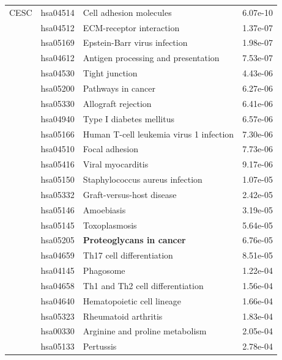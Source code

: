 \begin{longtable}{cllr}
\midrule 
CESC & hsa04514 & \textcolor{\clrnew}{Cell adhesion molecules} & 6.07e-10\\ 
 & hsa04512 & \textcolor{\clrnew}{ECM-receptor interaction} & 1.37e-07 \\ 
 & hsa05169 & \textcolor{\clrnew}{Epstein-Barr virus infection} & 1.98e-07 \\ 
 & hsa04612 & \textcolor{\clrnew}{Antigen processing and presentation} & 7.53e-07 \\ 
 & hsa04530 & \textcolor{\clrnew}{Tight junction} & 4.43e-06 \\ 
 & hsa05200 & \textcolor{\clrnew}{Pathways in cancer} & 6.27e-06 \\ 
 & hsa05330 & \textcolor{\clrnew}{Allograft rejection} & 6.41e-06 \\ 
 & hsa04940 & \textcolor{\clrnew}{Type I diabetes mellitus} & 6.57e-06 \\ 
 & hsa05166 & \textcolor{\clrnew}{Human T-cell leukemia virus 1 infection} & 7.30e-06 \\ 
 & hsa04510 & \textcolor{\clrnew}{Focal adhesion} & 7.73e-06 \\ 
 & hsa05416 & \textcolor{\clrnew}{Viral myocarditis} & 9.17e-06 \\ 
 & hsa05150 & \textcolor{\clrnew}{Staphylococcus aureus infection} & 1.07e-05 \\ 
 & hsa05332 & \textcolor{\clrnew}{Graft-versus-host disease} & 2.42e-05 \\ 
 & hsa05146 & \textcolor{\clrnew}{Amoebiasis} & 3.19e-05 \\ 
 & hsa05145 & \textcolor{\clrnew}{Toxoplasmosis} & 5.64e-05 \\ 
 \rowcolor{\clrpath}& hsa05205 & \textbf{Proteoglycans in cancer} & 6.76e-05 \\ 
 & hsa04659 & \textcolor{\clrnew}{Th17 cell differentiation} & 8.51e-05 \\ 
 & hsa04145 & \textcolor{\clrnew}{Phagosome} & 1.22e-04 \\ 
 & hsa04658 & \textcolor{\clrnew}{Th1 and Th2 cell differentiation} & 1.56e-04 \\ 
 & hsa04640 & \textcolor{\clrnew}{Hematopoietic cell lineage} & 1.66e-04 \\ 
 & hsa05323 & \textcolor{\clrnew}{Rheumatoid arthritis} & 1.83e-04 \\ 
 & hsa00330 & \textcolor{\clrnew}{Arginine and proline metabolism} & 2.05e-04 \\ 
 & hsa05133 & \textcolor{\clrnew}{Pertussis} & 2.78e-04 \\ 

\end{longtable}
